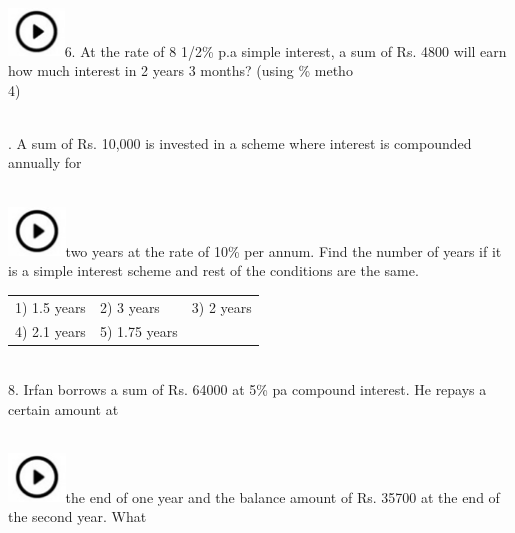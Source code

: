 \documentclass{article}
\begin{document}
	\noindent 
	
	\noindent 
	
	\noindent 
	
\newpage
	 
	\noindent \\ \includegraphics*[width=0.59in, height=0.52in]{images/image1}6.   At the rate of 8 1/2\% p.a simple interest, a sum of Rs. 4800 will earn how much interest in 2 years 3 months? (using \% metho\\
4)
	
	\noindent 
	
	\noindent  \\ 
	
	.   A sum of Rs. 10,000 is invested in a scheme where interest is compounded       annually    for
	
	\noindent 
	
	\noindent  
	 
	\noindent \\ \includegraphics*[width=0.60in, height=0.52in]{images/image1}two years at the rate of 10\% per annum. Find the number of years if it is a simple interest scheme and rest of the conditions are the same.
	
	\noindent 
	
	\noindent \begin{tabular}{p{1.7in} p{1.6in} p{1.6in}} \\ 
 1) 1.5 years            & 2) 3 years         & 3) 2 years         \\
4) 2.1 years      & 5) 1.75 years \\
\end{tabular}
	
	\noindent  \\ 
	
	8.   Irfan borrows a sum of Rs. 64000 at 5\% pa compound interest. He repays a certain amount at  
	 
	\noindent \\ \includegraphics*[width=0.60in, height=0.52in]{images/image1}the end of one year and the balance amount of Rs. 35700 at the end of the second year. What
	
\end{document}
